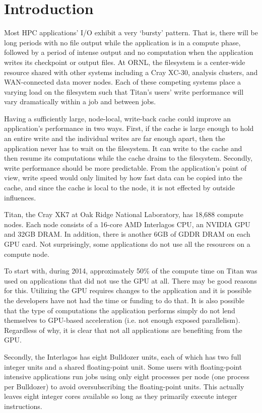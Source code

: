 \section{Introduction}
\label{sec:intro}

Most HPC applications' I/O exhibit a very `bursty' pattern. That is, there will be long periods with no file output while the application is in a compute phase, followed by a period of intense output and no computation when the application writes its checkpoint or output files.  At ORNL, the filesystem is a center-wide resource shared with other systems including a Cray XC-30, analysis clusters, and WAN-connected data mover nodes. Each of these competing systems place a varying load on the filesystem such that Titan's users' write performance will vary dramatically within a job and between jobs.

Having a sufficiently large, node-local, write-back cache could improve an application's performance in two ways.  First, if the cache is large enough to hold an entire write and the individual writes are far enough apart, then the application never has to wait on the filesystem.  It can write to the cache and then resume its computations while the cache drains to the filesystem.  Secondly, write performance should be more predictable. From the application's point of view, write speed would only limited by how fast data can be copied into the cache, and since the cache is local to the node, it is not effected by outside influences.

Titan, the Cray XK7 at Oak Ridge National Laboratory, has 18,688 compute nodes. Each node consists of a 16-core AMD Interlagos CPU, an NVIDIA GPU and 32GB DRAM. In addition, there is another 6GB of GDDR DRAM on each GPU card. Not surprisingly, some applications do not use all the resources on a compute node.

To start with, during 2014, approximately 50\% of the compute time on Titan was used on applications that did not use the GPU at all.\cite{oareport}
There may be good reasons for this.  Utilizing the GPU requires changes to the application and it is possible the developers have not had the time or funding to do that.  It is also possible that the type of computations the application performs simply do not lend themselves to GPU-based acceleration (i.e. not enough exposed parallelism).  Regardless of why, it is clear that not all applications are benefiting from the GPU.

Secondly, the Interlagos has eight Bulldozer units, each of which has two full integer units and a shared floating-point unit. Some users with floating-point intensive applications run jobs using only eight processes per node (one process per Bulldozer) to avoid oversubscribing the floating-point units. This actually leaves eight integer cores available so long as they primarily execute integer instructions. 

